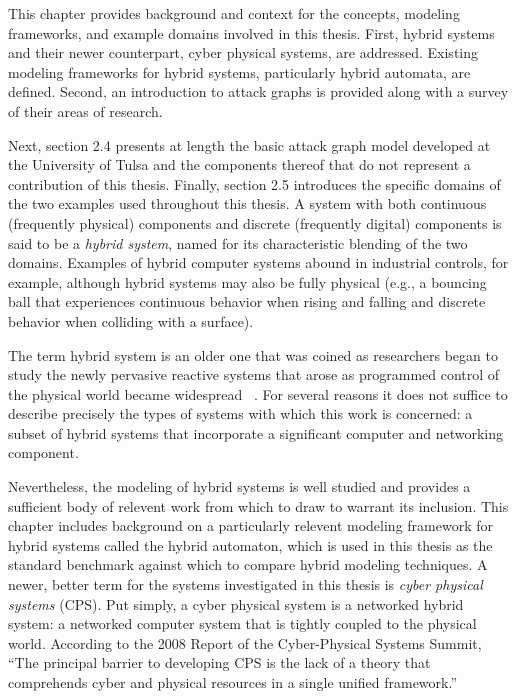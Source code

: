 This chapter provides background and context for the concepts, modeling
frameworks, and example domains involved in this thesis. First, hybrid systems
and their newer counterpart, cyber physical systems, are addressed. Existing
modeling frameworks for hybrid systems, particularly hybrid automata, are
defined. Second, an introduction to attack graphs is provided along with a
survey of their areas of research.

Next, section 2.4 presents at length the basic attack graph model developed at the
University of Tulsa and the components thereof that do not represent a
contribution of this thesis. Finally, section 2.5 introduces the specific
domains of the two examples used throughout this thesis.
A system with both continuous (frequently physical) components and discrete (frequently digital)
components is said to be a \emph{hybrid system}, named for its characteristic blending of the
two domains. Examples of hybrid computer systems abound in industrial controls, for example,
although hybrid systems may also be fully physical (e.g., a bouncing ball that experiences continuous
behavior when rising and falling and discrete behavior when colliding with a surface).

The term hybrid system is an older one that was coined as researchers began to study the newly
pervasive reactive systems that arose as programmed control of the physical world became 
widespread ~\cite{alur1993hybrid}. For several reasons it does not suffice to describe precisely
the types of systems with which this work is concerned: a subset of hybrid
systems that incorporate a significant computer and networking component.

Nevertheless, the modeling of hybrid systems is well studied and provides a sufficient body
of relevent work from which to draw to warrant its inclusion. This chapter includes
background on a particularly relevent modeling framework for hybrid systems called the
hybrid automaton, which is used in this thesis as the standard benchmark against which to
compare hybrid modeling techniques.
A newer, better term for the systems investigated in this thesis is \emph{cyber physical systems}
 (CPS).
Put simply, a cyber physical system is a networked hybrid system: a networked computer system that is 
tightly coupled to the physical world.
According to the 2008 Report of the Cyber-Physical Systems Summit, ``The principal barrier to 
developing CPS is the lack of a theory that comprehends cyber and physical resources in a 
single unified framework.''~\cite{summitreport2008}

